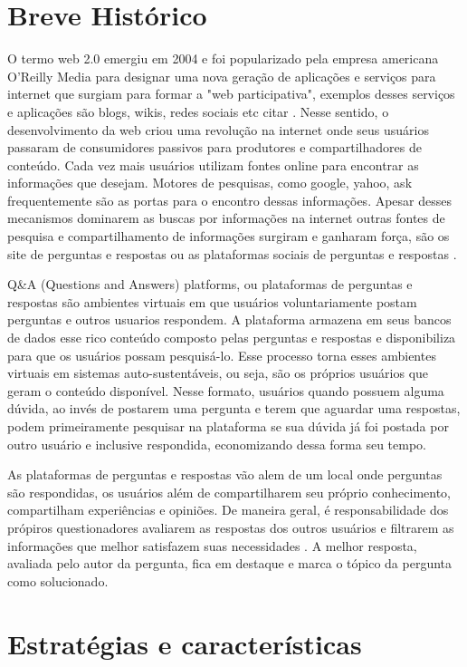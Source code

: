 \section{Breve Histórico}%

O termo web 2.0 emergiu em 2004 e foi popularizado pela empresa americana O'Reilly Media para designar uma nova geração de aplicações e serviços para internet
 que surgiam para formar a "web participativa", exemplos desses serviços e aplicações são  blogs, wikis, redes sociais etc citar \cite{madden2006riding}.  Nesse sentido,
 o desenvolvimento da web criou uma revolução na internet onde  seus usuários passaram de consumidores passivos  para produtores e compartilhadores de conteúdo. 
Cada vez mais usuários utilizam fontes online para encontrar as informações que desejam. Motores de pesquisas, como google, yahoo, ask frequentemente são as portas
 para o encontro dessas informações. Apesar desses mecanismos dominarem as buscas por informações na internet outras fontes de pesquisa e compartilhamento de informações
 surgiram e ganharam força, são os site de perguntas e respostas ou as plataformas sociais de perguntas e respostas \cite{shah2008explorin}.

Q\&A (Questions and Answers) platforms, ou plataformas de perguntas e respostas são ambientes virtuais em que usuários voluntariamente postam perguntas e outros usuarios respondem.
 A plataforma armazena em seus bancos de dados esse rico conteúdo composto pelas perguntas e respostas e disponibiliza para que os usuários possam pesquisá-lo. Esse processo torna
 esses ambientes virtuais em sistemas auto-sustentáveis, ou seja, são os próprios usuários que geram o conteúdo disponível. Nesse formato, usuários quando possuem alguma dúvida, 
 ao invés de postarem uma pergunta e terem que aguardar uma respostas, podem primeiramente pesquisar na plataforma se sua dúvida já foi postada por outro usuário e inclusive respondida,
 economizando dessa forma seu tempo.
 
As plataformas de perguntas e respostas vão alem de um local onde perguntas são respondidas, os usuários além de compartilharem seu próprio conhecimento, compartilham experiências e opiniões. De maneira geral, é responsabilidade dos
 própiros questionadores avaliarem as respostas dos outros usuários e filtrarem as informações que melhor satisfazem suas necessidades \cite{kim2007best}. 
 A melhor resposta, avaliada pelo autor da pergunta, fica em destaque e marca o tópico da pergunta como solucionado.

\section{Estratégias e características}%

